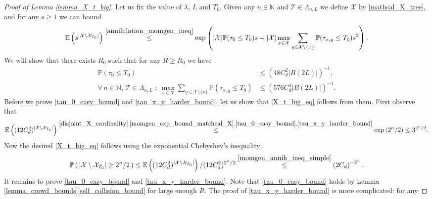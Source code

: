 \documentclass[a4paper,12pt]{article}
\begin{document}
\begin{proof}[Proof of Lemma \ref{lemma_X_t_big}] Let us fix the value of $\lambda$, $L$ and $T_0$. Given any $n \in \mathbb{N}$ and $\mathcal{T} \in \Lambda_{n,L}$ we define $\mathcal{X}$ by
\eqref{mathcal_X_tree}, and for any $s \geq 1$ we can bound
\begin{equation}\label{momgen_exp_bound_matchcal_X}
\mathbb{E}\left( s^{|\mathcal{X} \setminus \mathcal{X}_{T_0}|} \right) \stackrel{ \eqref{annihilation_momgen_ineq} }{\leq }
\exp\left( |\mathcal{X}| \mathbb{P}(\tau_{0} \leq T_0 ) s + |\mathcal{X}| \max_{x \in \mathcal{X}}
\sum_{y \in \mathcal{X}\setminus \{ x \} }  \mathbb{P}(\tau_{x,y} \leq T_0 ) s^2
 \right).
\end{equation}
We will show that there exists $R_0$ such that for
any $R \geq R_0$ we have
\begin{align}
\label{tau_0_easy_bound}
\mathbb{P}(\tau_{0} \leq T_0 ) & \leq (48 C^2_d |B(2L)| )^{-1},\\
\label{tau_x_y_harder_bound}
\forall \, n \in \mathbb{N}, \, \mathcal{T} \in \Lambda_{n,L} \; : \;
\max_{x \in \mathcal{X}}
\sum_{y \in \mathcal{X}\setminus \{ x \} }  \mathbb{P}(\tau_{x,y} \leq T_0 )  & \leq (576 C_d^4 |B(2L)|)^{-1}.
\end{align}
 Before we prove \eqref{tau_0_easy_bound}
and \eqref{tau_x_y_harder_bound}, let us show that \eqref{X_t_big_eq} follows from them. First observe that
\begin{equation}\label{momgen_annih_ineq_simple}
  \mathbb{E}\left( (12 C_d^2)^{|\mathcal{X} \setminus \mathcal{X}_{T_0}|} \right)
  \stackrel{ \eqref{disjoint_X_cardinality}, \eqref{momgen_exp_bound_matchcal_X},\eqref{tau_0_easy_bound}, \eqref{tau_x_y_harder_bound}     }{ \leq }
  \exp\left( 2^n/2 \right)\leq 3^{2^n/2}.
\end{equation}
Now the desired \eqref{X_t_big_eq} follows using the exponential Chebyshev's inequality:
\begin{equation}
   \mathbb{P}\left(\, |\mathcal{X} \setminus \mathcal{X}_{T_0}| \geq  2^n /2 \, \right) \leq
    \mathbb{E}\left( (12 C_d^2)^{|\mathcal{X} \setminus \mathcal{X}_{T_0}|} \right) / (12 C_d^2)^{2^n/2}
    \stackrel{ \eqref{momgen_annih_ineq_simple} }{ \leq }
    \left( 2 C_d  \right)^{-2^n}.
\end{equation}
It remains to prove \eqref{tau_0_easy_bound}
and \eqref{tau_x_y_harder_bound}. Note that \eqref{tau_0_easy_bound} holds by Lemma \ref{lemma_crowd_bounds}\eqref{self_collision_bound} for
large enough $R$. The proof of  \eqref{tau_x_y_harder_bound} is more complicated: for any

\end{proof}
\end{document}
